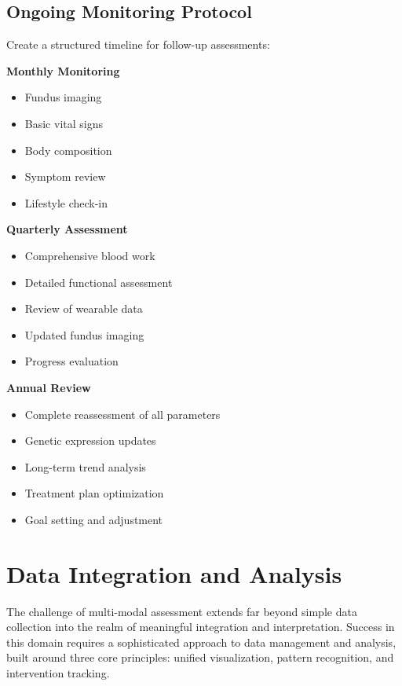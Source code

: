 \documentclass[
  Letterpaper,
]{scrbook}
\providecommand{\tightlist}{%
  \setlength{\itemsep}{0pt}\setlength{\parskip}{0pt}}\usepackage{longtable,booktabs,array}
\begin{document}
\subsection{Ongoing Monitoring
Protocol}\label{ongoing-monitoring-protocol}

Create a structured timeline for follow-up assessments:

\textbf{Monthly Monitoring}

\begin{itemize}
\tightlist
\item
  Fundus imaging
\item
  Basic vital signs
\item
  Body composition
\item
  Symptom review
\item
  Lifestyle check-in
\end{itemize}

\textbf{Quarterly Assessment}

\begin{itemize}
\tightlist
\item
  Comprehensive blood work
\item
  Detailed functional assessment
\item
  Review of wearable data
\item
  Updated fundus imaging
\item
  Progress evaluation
\end{itemize}

\textbf{Annual Review}

\begin{itemize}
\tightlist
\item
  Complete reassessment of all parameters
\item
  Genetic expression updates
\item
  Long-term trend analysis
\item
  Treatment plan optimization
\item
  Goal setting and adjustment
\end{itemize}

\section{Data Integration and
Analysis}\label{data-integration-and-analysis}

The challenge of multi-modal assessment extends far beyond simple data
collection into the realm of meaningful integration and interpretation.
Success in this domain requires a sophisticated approach to data
management and analysis, built around three core principles: unified
visualization, pattern recognition, and intervention tracking.
\end{document}
